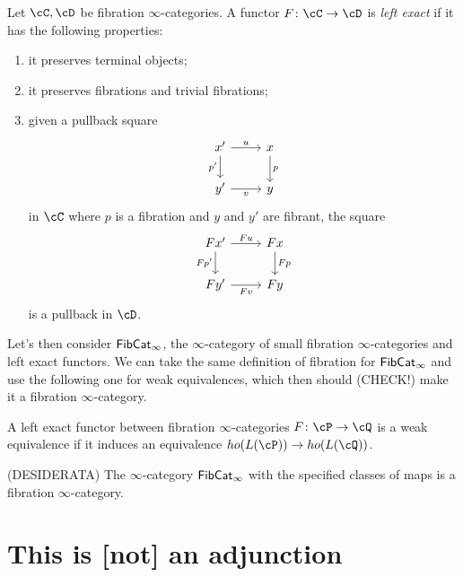 \documentclass[a4paper,12pt,openany]{scrartcl}
\begin{document}
\begin{defn}
  Let $\cC,\cD$ be fibration $\infty$-categories. A functor
  $F\colon\cC\rightarrow\cD$ is \emph{left exact} if it has the following
  properties:
  \begin{enumerate}
    \item it preserves terminal objects;
    \item it preserves fibrations and trivial fibrations;
    \item given a pullback square
      \[\begin{tikzcd}
        {x'} & x \\
        {y'} & y
        \arrow["p", from=1-2, to=2-2]
        \arrow["{p'}"', from=1-1, to=2-1]
        \arrow["v"', from=2-1, to=2-2]
        \arrow["u", from=1-1, to=1-2]
      \end{tikzcd}\]
      in $\cC$ where $p$ is a fibration and $y$ and $y'$ are fibrant, the square
      \[\begin{tikzcd}
        {Fx'} & Fx \\
        {Fy'} & Fy
        \arrow["Fp", from=1-2, to=2-2]
        \arrow["{Fp'}"', from=1-1, to=2-1]
        \arrow["Fv"', from=2-1, to=2-2]
        \arrow["Fu", from=1-1, to=1-2]
      \end{tikzcd}\]
      is a pullback in $\cD$.
  \end{enumerate}
\end{defn}

Let's then consider $\operatorname{\mathsf{FibCat}}_\infty$, the $\infty$-category of small fibration
$\infty$-categories and left exact functors. We can take the same definition of
fibration for $\operatorname{\mathsf{FibCat}}_\infty$ and use the following one for weak equivalences, which then should (CHECK!)
make it a fibration $\infty$-category.

\begin{defn}
    A left exact functor between fibration $\infty$-categories $F\colon\cP\rightarrow\cQ$ is a weak equivalence if it induces an equivalence $ho(L(\cP))\rightarrow ho(L(\cQ))$.
\end{defn}

\begin{prop}
  (DESIDERATA) The $\infty$-category $\operatorname{\mathsf{FibCat}}_\infty$ with the specified classes
  of maps is a fibration $\infty$-category.
\end{prop}

\section{This is [not] an adjunction}
\end{document}
